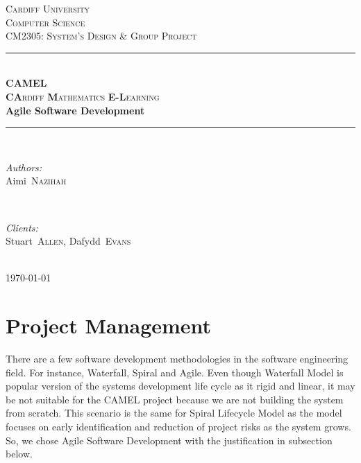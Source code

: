 \documentclass[12pt]{article}
\begin{document}
	\begin{titlepage}
		\newcommand{\HRule}{\rule{\linewidth}{0.5mm}}
		
		\center
		
		\textsc{\LARGE Cardiff University}\\[1.5cm]
		\textsc{\Large Computer Science}\\[0.5cm]
		\textsc{\large CM2305: System's Design \& Group Project}\\[0.5cm]
		
		\HRule \\[0.4cm]
		\textsc{\Large \textbf{CAMEL}}\\[0.1cm]
		\textsc{\Large \textbf{CA}rdiff \textbf{M}athematics \textbf{E-L}earning}\\[0.7cm]
		{\huge\bfseries Agile Software Development}\\[0.4cm]
		\HRule \\[1.5cm]
		
		\begin{minipage}{0.4\textwidth}
			\begin{flushleft} \large
				\emph{Authors:}\\
				\mbox{Aimi \textsc{Nazihah}}
			\end{flushleft}
		\end{minipage}
		~
		\begin{minipage}{0.4\textwidth}
			\begin{flushright} \large
				\emph{Clients:} \\
				\mbox{Stuart \textsc{Allen}}, \mbox{Dafydd \textsc{Evans}}
			\end{flushright}
		\end{minipage}\\[3cm]
		
		{\large \today}\\[2cm]
		
		\vfill
	\end{titlepage}
	
	
	\tableofcontents
	
	\newpage
	
	\section{Project Management}
		There are a few software development methodologies in the software engineering field. For instance, Waterfall, Spiral and Agile. Even though Waterfall Model is popular version of the systems development life cycle as it rigid and linear, it may be not suitable for the CAMEL project because we are not building the system from scratch. This scenario is the same for Spiral Lifecycle Model as the model focuses on early identification and reduction of project risks as the system grows. So, we chose Agile Software Development with the justification in subsection below.
		
\end{document}
